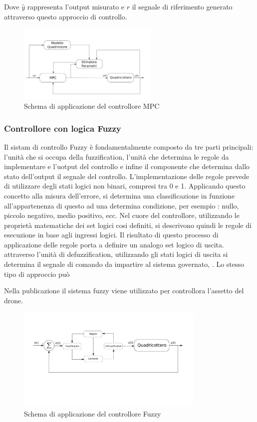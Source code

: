 Dove $\hat{y}$ rappresenta l'output misurato e $r$ il segnale di riferimento generato attraverso questo approccio di controllo.

\begin{figure}
	\centering
	\includegraphics[width=0.6\textwidth]{SistemaQuadrirotore/Figure/MPC}
	\caption{Schema di applicazione del controllore MPC}
\end{figure}

\subsubsection{Controllore con logica Fuzzy}

Il sistam di controllo Fuzzy è fondamentalmente composto da tre parti principali: l'unità che si occupa della fuzzification, l'unità che determina le regole da implementare e l'uotput del controllo e infine il componente che determina dallo stato dell'output il segnale del controllo. 
L'implementazione delle regole prevede di utilizzare degli stati logici non binari, compresi tra 0 e 1. Applicando questo concetto alla misura dell'errore, si determina una classificazione in funzione all'appartenenza di questo ad una determina condizione, per esempio : nullo, piccolo negativo, medio positivo, ecc. Nel cuore del controllore, utilizzando le proprietà matematiche dei set logici cosi definiti, si descrivono quindi le regole di esecuzione in base agli ingressi logici. Il risultato di questo processo di applicazione delle regole porta a definire un analogo set logico di uscita. attraverso l'unità di defuzzification, utilizzando gli stati logici di uscita si determina il segnale di comando da impartire al sistema governato, \cite{introFuzzy}.
Lo stesso tipo di approccio può

Nella publicazione \cite{introFuzzy} il sistema fuzzy viene utilizzato per controllora l'assetto del drone.

\begin{figure}
	\centering
	\includegraphics[width=0.8\textwidth]{SistemaQuadrirotore/Figure/Fuzzy}
	\caption{Schema di applicazione del controllore Fuzzy}
\end{figure}

